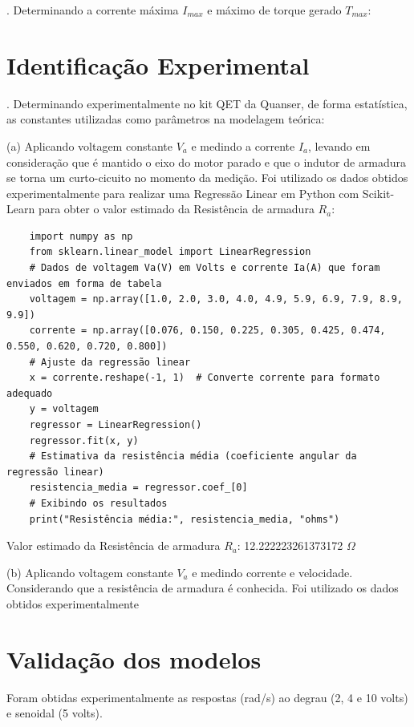\documentclass[10pt]{article}
\begin{document}
. Determinando a corrente máxima $I_{max}$ e máximo de torque gerado $T_{max}$:

\section{Identificação Experimental}

. Determinando experimentalmente no kit QET da Quanser, de forma estatística,
as constantes utilizadas como parâmetros na modelagem teórica:

\quad (a) Aplicando voltagem constante $V_a$ e medindo a corrente $I_a$,
levando em consideração que é mantido o eixo do motor parado
e que o indutor de armadura se torna um curto-cicuito no momento da medição.
Foi utilizado os dados obtidos experimentalmente para realizar uma Regressão Linear em Python com Scikit-Learn
para obter o valor estimado da Resistência de armadura $R_a$:

\begin{verbatim}
    import numpy as np
    from sklearn.linear_model import LinearRegression
    # Dados de voltagem Va(V) em Volts e corrente Ia(A) que foram enviados em forma de tabela
    voltagem = np.array([1.0, 2.0, 3.0, 4.0, 4.9, 5.9, 6.9, 7.9, 8.9, 9.9])
    corrente = np.array([0.076, 0.150, 0.225, 0.305, 0.425, 0.474, 0.550, 0.620, 0.720, 0.800])
    # Ajuste da regressão linear
    x = corrente.reshape(-1, 1)  # Converte corrente para formato adequado
    y = voltagem
    regressor = LinearRegression()
    regressor.fit(x, y)
    # Estimativa da resistência média (coeficiente angular da regressão linear)
    resistencia_media = regressor.coef_[0]
    # Exibindo os resultados
    print("Resistência média:", resistencia_media, "ohms")
\end{verbatim}

Valor estimado da Resistência de armadura $R_a$: 12.222223261373172 $\Omega$

\quad (b) Aplicando voltagem constante $V_a$ e medindo corrente e velocidade.
Considerando que a resistência de armadura é conhecida. Foi utilizado os dados obtidos
experimentalmente

\section{Validação dos modelos}

\quad Foram obtidas experimentalmente as respostas (rad/s) ao degrau (2, 4 e 10 volts) e
senoidal (5 volts).
\end{document}
